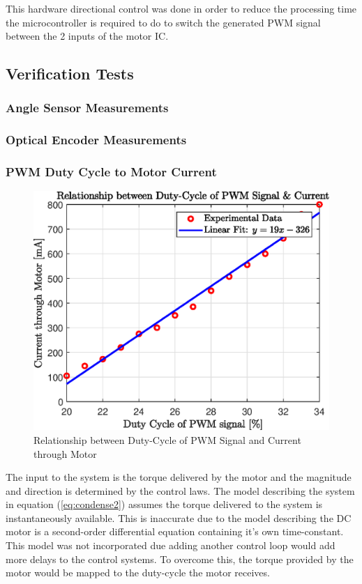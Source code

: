 This hardware directional control was done in order to reduce the processing time the microcontroller is required to do to switch the generated PWM signal between the 2 inputs of the motor IC.

\subsection{Verification Tests}

\subsubsection{Angle Sensor Measurements}

\subsubsection{Optical Encoder Measurements}

\subsubsection{ PWM Duty Cycle to Motor Current}

\begin{figure}[h]
	\centering
	\includegraphics[scale=1]{./figs/dutycycle_vs_current.eps}
	\caption{Relationship between Duty-Cycle of PWM Signal and Current through Motor}
	\label{fig:dutycycle_vs_current}
\end{figure}

The input to the system is the torque delivered by the motor and the magnitude and direction is determined by the control laws. The model describing the system in equation (\ref{eq:condense2}) assumes the torque delivered to the system is instantaneously available. This is inaccurate due to the model describing the DC motor is a second-order differential equation containing it's own time-constant. This model was not incorporated due adding another control loop would add more delays to the control systems. To overcome this, the torque provided by the motor would be mapped to the duty-cycle the motor receives.\\


